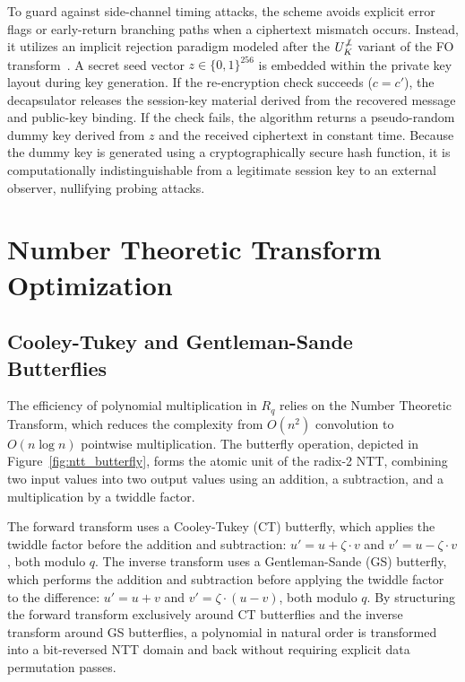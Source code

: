 To guard against side-channel timing attacks, the scheme avoids explicit error flags or early-return branching paths when a ciphertext mismatch occurs. Instead, it utilizes an implicit rejection paradigm modeled after the $U_K^{\not\bot}$ variant of the FO transform~\cite{HHK17}. A secret seed vector $z \in \{0,1\}^{256}$ is embedded within the private key layout during key generation. If the re-encryption check succeeds ($c = c'$), the decapsulator releases the session-key material derived from the recovered message and public-key binding. If the check fails, the algorithm returns a pseudo-random dummy key derived from $z$ and the received ciphertext in constant time. Because the dummy key is generated using a cryptographically secure hash function, it is computationally indistinguishable from a legitimate session key to an external observer, nullifying probing attacks.

\section{Number Theoretic Transform Optimization}
\label{sec:ntt_optimization}

\subsection{Cooley-Tukey and Gentleman-Sande Butterflies}
\label{sub:ntt_butterflies}

The efficiency of polynomial multiplication in $R_q$ relies on the Number Theoretic Transform, which reduces the complexity from $O(n^2)$ convolution to $O(n \log n)$ pointwise multiplication. The butterfly operation, depicted in Figure~\ref{fig:ntt_butterfly}, forms the atomic unit of the radix-2 NTT, combining two input values into two output values using an addition, a subtraction, and a multiplication by a twiddle factor.

The forward transform uses a Cooley-Tukey (CT) butterfly, which applies the twiddle factor before the addition and subtraction: $u' = u + \zeta \cdot v$ and $v' = u - \zeta \cdot v$, both modulo $q$. The inverse transform uses a Gentleman-Sande (GS) butterfly, which performs the addition and subtraction before applying the twiddle factor to the difference: $u' = u + v$ and $v' = \zeta \cdot (u - v)$, both modulo $q$. By structuring the forward transform exclusively around CT butterflies and the inverse transform around GS butterflies, a polynomial in natural order is transformed into a bit-reversed NTT domain and back without requiring explicit data permutation passes.

